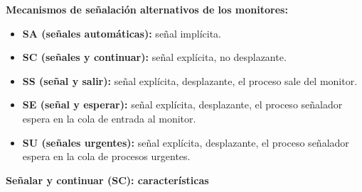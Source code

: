 \documentclass[a4paper,11pt]{article}
\begin{document}
\textbf{Mecanismos de señalación alternativos de los monitores:}
\begin{itemize}
\item \textbf{SA (señales automáticas):} señal implícita.

\item \textbf{SC (señales y continuar):} señal explícita, no desplazante.

\item \textbf{SS (señal y salir):} señal explícita, desplazante, el proceso sale del monitor.

\item \textbf{SE (señal y esperar):} señal explícita, desplazante, el proceso señalador espera en la cola de entrada al monitor.

\item \textbf{SU (señales urgentes):} señal explícita, desplazante, el proceso señalador espera en la cola de procesos urgentes.
\end{itemize}

\textbf{Señalar y continuar (SC): características}
\end{document}
